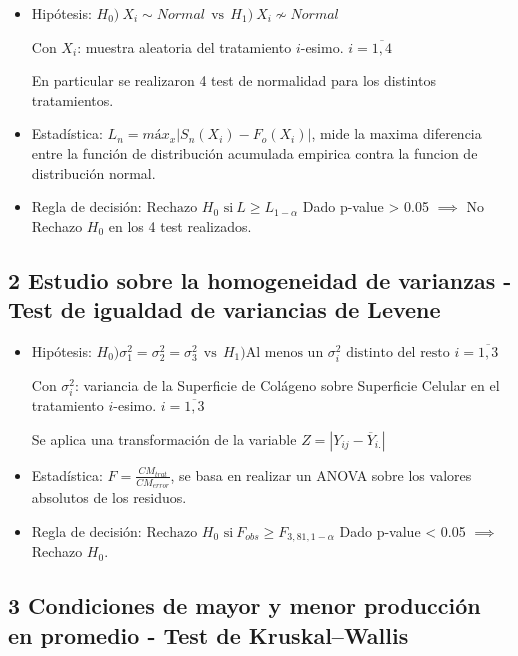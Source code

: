\documentclass[
  11pt,
]{article}
\begin{document}
\begin{itemize}
\item
  Hipótesis:
  \(H_0) \ X_i \sim Normal \ \ \text{vs} \ \ H_1) \ X_i \nsim Normal\)

  Con \(X_i\): muestra aleatoria del tratamiento \(i\)-esimo.
  \(i = \overline{1,4}\)

  En particular se realizaron 4 test de normalidad para los distintos
  tratamientos.
\item
  Estadística: \(L_n = máx_x |S_n(X_i) - F_o(X_i)|\), mide la maxima
  diferencia entre la función de distribución acumulada empirica contra
  la funcion de distribución normal.
\item
  Regla de decisión:
  \(\text{Rechazo } H_0 \text{ si} \ L \ge L_{1 - \alpha}\) Dado p-value
  \textgreater{} 0.05 \(\implies\) No Rechazo \(H_0\) en los 4 test
  realizados.
\end{itemize}

\subsection{2 Estudio sobre la homogeneidad de varianzas - Test de
igualdad de variancias de
Levene}\label{estudio-sobre-la-homogeneidad-de-varianzas---test-de-igualdad-de-variancias-de-levene}

\begin{itemize}
\item
  Hipótesis:
  \(H_0) \sigma_1^2 = \sigma_2^2 = \sigma_3^2 \ \ \text{vs} \ \ H_1) \text{Al menos un } \sigma_i^2 \text{ distinto del resto } i=\overline{1,3}\)

  Con \(\sigma_i^2\): variancia de la Superficie de Colágeno sobre
  Superficie Celular en el tratamiento \(i\)-esimo.
  \(i = \overline{1,3}\)

  Se aplica una transformación de la variable
  \(Z = |Y_{ij} - \overline{Y}_{i.}|\)
\item
  Estadística: \(F = \frac{CM_{trat}}{CM_{error}}\), se basa en realizar
  un ANOVA sobre los valores absolutos de los residuos.
\item
  Regla de decisión:
  \(\text{Rechazo } H_0 \text{ si} \ F_{obs} \geq F_{3, 81, 1 - \alpha}\)
  Dado p-value \textless{} 0.05 \(\implies\) Rechazo \(H_0\).
\end{itemize}

\subsection{3 Condiciones de mayor y menor producción en promedio - Test
de
Kruskal--Wallis}\label{condiciones-de-mayor-y-menor-producciuxf3n-en-promedio---test-de-kruskalwallis}
\end{document}

